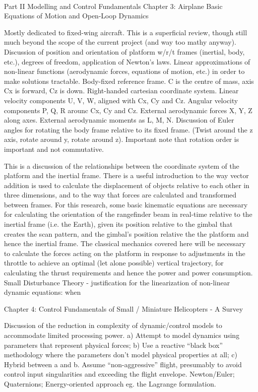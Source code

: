 ~~~

Part II Modelling and Control Fundamentals
Chapter 3: Airplane Basic Equations of Motion and Open-Loop Dynamics

Mostly dedicated to fixed-wing aircraft.
This is a superficial review, though still much beyond the scope of the current project (and way too mathy anyway).
Discussion of position and orientation of platform w/r/t frames (inertial, body, etc.), degrees of freedom, application of Newton’s laws.
Linear approximations of non-linear functions (aerodynamic forces, equations of motion, etc.) in order to make solutions tractable.
Body-fixed reference frame. C is the centre of mass, axis Cx is forward, Cz is down. Right-handed cartesian coordinate system.
Linear velocity components U, V, W, aligned with Cx, Cy and Cz.
Angular velocity components P, Q, R arounc Cx, Cy and Cz.
External aerodynamic forces X, Y, Z along axes. External aerodynamic moments as L, M, N.
Discussion of Euler angles for rotating the body frame relative to its fixed frame. (Twist around the z axis, rotate around y, rotate around z).
Important note that rotation order is important and not commutative.


This is a discussion of the relationships between the coordinate system of the platform and the inertial frame. There is a useful introduction to the way vector addition is used to calculate the displacement of objects relative to each other in three dimensions, and to the way that forces are calculated and transformed between frames. 
For this research, some basic kinematic equations are necessary for calculating the orientation of the rangefinder beam in real-time relative to the inertial frame (i.e. the Earth), given its position relative to the gimbal that creates the scan pattern, and the gimbal’s position relative the the platform and hence the inertial frame. 
The classical mechanics covered here will be necessary to calculate the forces acting on the platform in response to adjustments in the throttle to achieve an optimal (let alone possible) vertical trajectory, for calculating the thrust requirements and hence the power and power consumption.
Small Disturbance Theory - justification for the linearization of non-linear dynamic equations: when 

Chapter 4: Control Fundamentals of Small / Miniature Helicopters - A Survey

Discussion of the reduction in complexity of dynamic/control models to accommodate limited processing power. 
a) Attempt to model dynamics using parameters that represent physical forces; b) Use a reactive “black box” methodology where the parameters don’t model physical properties at all; c) Hybrid between a and b.
Assume “non-aggressive” flight, presumably to avoid control input singularities and exceeding the flight envelope.
Newton/Euler; Quaternions; Energy-oriented approach eg. the Lagrange formulation.

